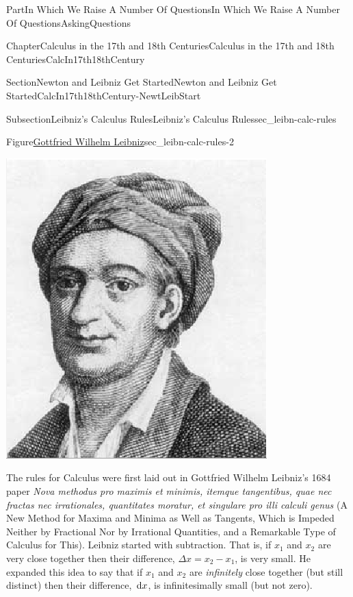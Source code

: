\documentclass[oneside,10pt,]{book}
\numberwithin{equation}{part}
\newcommand{\dx}[1]{\,{\rm d}#1}
\begin{document}
\begin{partptx}{Part}{In Which We Raise A Number Of Questions}{}{In Which We Raise A Number Of Questions}{}{}{AskingQuestions}
\begin{chapterptx}{Chapter}{Calculus in the 17th and 18th Centuries}{}{Calculus in the 17th and 18th Centuries}{}{}{CalcIn17th18thCentury}
\begin{sectionptx}{Section}{Newton and Leibniz Get Started}{}{Newton and Leibniz Get Started}{}{}{CalcIn17th18thCentury-NewtLeibStart}
\begin{subsectionptx}{Subsection}{Leibniz's Calculus Rules}{}{Leibniz's Calculus Rules}{}{}{sec_leibn-calc-rules}
\begin{figureptx}{Figure}{\href{https://mathshistory.st-andrews.ac.uk/Biographies/Leibniz/}{Gottfried Wilhelm Leibniz}\protect\footnotemark{}}{sec_leibn-calc-rules-2}{}
\begin{image}{0.325}{0.35}{0.325}{}
\includegraphics[width=\linewidth]{external/images/Leibniz.png}
\end{image}%
\tcblower
\end{figureptx}%
%
The rules for Calculus were first laid out in Gottfried Wilhelm Leibniz's 1684 paper \textit{Nova methodus pro maximis et minimis, itemque tangentibus, quae nec fractas nec irrationales, quantitates moratur, et singulare pro illi calculi genus} (A New Method for Maxima and Minima as Well as Tangents, Which is Impeded Neither by Fractional Nor by Irrational Quantities, and a Remarkable Type of Calculus for This). Leibniz started with subtraction.  That is, if \(x_1\) and \(x_2\) are very close together then their difference, \(\Delta
x=x_2-x_1\), is very small.  He expanded this idea to say that if \(x_1\) and \(x_2\) are \emph{infinitely} close together (but still distinct) then their difference, \(\dx{ x}\), is infinitesimally small (but not zero).%

\end{subsectionptx}
\end{sectionptx}
\end{chapterptx}
\end{partptx}
\end{document}
